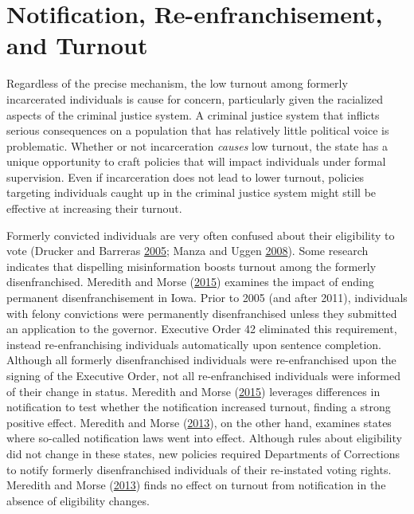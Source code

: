 \documentclass[
  12pt,
]{article}
\begin{document}
\hypertarget{notification-re-enfranchisement-and-turnout}{%
\section*{Notification, Re-enfranchisement, and Turnout}\label{notification-re-enfranchisement-and-turnout}}

Regardless of the precise mechanism, the low turnout among formerly incarcerated individuals is cause for concern, particularly given the racialized aspects of the criminal justice system. A criminal justice system that inflicts serious consequences on a population that has relatively little political voice is problematic. Whether or not incarceration \emph{causes} low turnout, the state has a unique opportunity to craft policies that will impact individuals under formal supervision. Even if incarceration does not lead to lower turnout, policies targeting individuals caught up in the criminal justice system might still be effective at increasing their turnout.

Formerly convicted individuals are very often confused about their eligibility to vote (Drucker and Barreras \protect\hyperlink{ref-Drucker2005}{2005}; Manza and Uggen \protect\hyperlink{ref-locked_out}{2008}). Some research indicates that dispelling misinformation boosts turnout among the formerly disenfranchised. Meredith and Morse (\protect\hyperlink{ref-Meredith2015}{2015}) examines the impact of ending permanent disenfranchisement in Iowa. Prior to 2005 (and after 2011), individuals with felony convictions were permanently disenfranchised unless they submitted an application to the governor. Executive Order 42 eliminated this requirement, instead re-enfranchising individuals automatically upon sentence completion. Although all formerly disenfranchised individuals were re-enfranchised upon the signing of the Executive Order, not all re-enfranchised individuals were informed of their change in status. Meredith and Morse (\protect\hyperlink{ref-Meredith2015}{2015}) leverages differences in notification to test whether the notification increased turnout, finding a strong positive effect. Meredith and Morse (\protect\hyperlink{ref-Meredith2013}{2013}), on the other hand, examines states where so-called notification laws went into effect. Although rules about eligibility did not change in these states, new policies required Departments of Corrections to notify formerly disenfranchised individuals of their re-instated voting rights. Meredith and Morse (\protect\hyperlink{ref-Meredith2013}{2013}) finds no effect on turnout from notification in the absence of eligibility changes.
\end{document}
